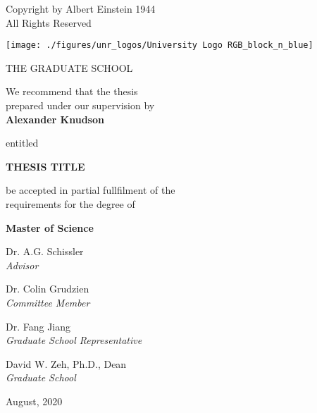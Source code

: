 \thispagestyle{empty}
\begin{center}
\vspace*{\fill}
Copyright by Albert Einstein 1944 \\
All Rights Reserved
\vspace*{\fill}
\end{center}


\newpage
\thispagestyle{empty}
\begin{center}

\texttt{[image: ./figures/unr\_logos/University Logo RGB\_block\_n\_blue]}

THE GRADUATE SCHOOL

\vspace{1em}
We recommend that the thesis \\
prepared under our supervision by\\

\vspace{1em}
\textbf{Alexander Knudson}

\vspace{1em}
entitled

\textbf{THESIS TITLE}

\vspace{2em}
be accepted in partial fullfilment of the \\
requirements for the degree of

\vspace{1em}
\textbf{Master of Science}

\vspace{1em}
Dr. A.G. Schissler \\
\textit{Advisor}

\vspace{1em}
Dr. Colin Grudzien\\
\textit{Committee Member}

\vspace{1em}
Dr. Fang Jiang \\
\textit{Graduate School Representative}

\vspace{1em}
David W. Zeh, Ph.D., Dean \\
\textit{Graduate School}

\vspace{1em}
August, 2020
\end{center}


